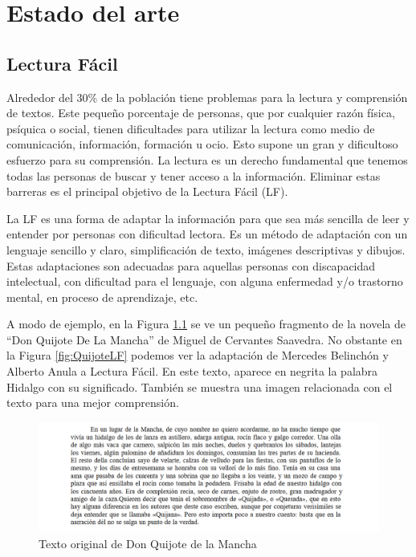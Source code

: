 \chapter{Estado del arte}
\label{cap:estadoDeLaCuestion}



\section{Lectura Fácil}
Alrededor del 30\% de la población tiene problemas para la lectura y comprensión de textos. Este pequeño porcentaje de personas, que por cualquier razón física, psíquica o social, tienen dificultades para utilizar la lectura como medio de comunicación, información, formación u ocio. Esto supone un gran y dificultoso esfuerzo para su comprensión. La lectura es un derecho fundamental que tenemos todas las personas de buscar y tener acceso a la información. Eliminar estas barreras es el principal objetivo de la Lectura Fácil (LF).

La LF es una forma de adaptar la información para que sea más sencilla de leer y entender por personas con dificultad lectora. Es un método de adaptación con un lenguaje sencillo y claro, simplificación de texto, imágenes descriptivas y dibujos. Estas adaptaciones son adecuadas para aquellas personas con discapacidad intelectual, con dificultad para el lenguaje, con alguna enfermedad y/o trastorno mental, en proceso de aprendizaje, etc.

 \setlength{\parskip}{10pt}


A modo de ejemplo, en la Figura \ref{fig:Quijote} se ve un pequeño fragmento de la novela de ``Don Quijote De La Mancha'' de Miguel de Cervantes Saavedra. No obstante en la Figura \ref{fig:QuijoteLF} podemos ver la adaptación de Mercedes Belinchón y Alberto Anula a Lectura Fácil. En este texto, aparece en negrita la palabra Hidalgo con su significado. También se muestra una imagen relacionada con el texto para una mejor comprensión.

 \setlength{\parskip}{10pt}
 

\begin{figure}[htb]
	\centering
	\includegraphics[width=1.10\textwidth]{Imagenes/Ejemplos/Cap1DonQuijote}
	\caption{Texto original de Don Quijote de la Mancha}
	\label{fig:Quijote}
\end{figure} 


